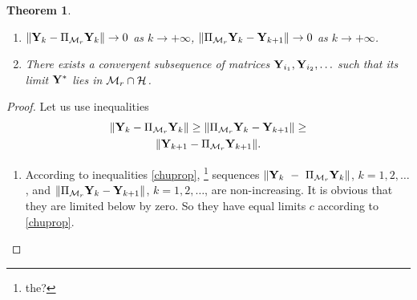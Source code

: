 \documentclass[sii]{ipart}
\newtheorem{theorem}{Theorem}
\begin{document}
\begin{theorem}
	\label{th:converg}
	\begin{enumerate}
		Let the space $\calM_r$ be closed in topology gererated by norm $\|\cdot\|$. Then
		\item $\|\mathbf{Y}_k - \Pi_{\mathcal{M}_r}\mathbf{Y}_k\| \to 0$ as $k \to +\infty$, $\|\Pi_{\mathcal{M}_r}\mathbf{Y}_k - \mathbf{Y}_{k+1}\| \to 0$ as $k \to +\infty$.
		\item There exists a convergent subsequence of matrices $\mathbf{Y}_{i_1}, \mathbf{Y}_{i_2}, \ldots$ such that its limit $\mathbf{Y}^*$ lies in $\mathcal{M}_r \cap \mathcal{H}$.
	\end{enumerate}
\end{theorem}
\begin{proof}
	Let us use inequalities \cite{Chu.etal2003}
	\begin{multline}
	\label{chuprop}
	\|\bfY_k - \Pi_{\calM_r} \bfY_k\| \ge \|\Pi_{\calM_r} \bfY_k - \bfY_{k + 1}\| \ge \\ \|\bfY_{k+1} - \Pi_{\calM_r} \bfY_{k + 1}\|.
	\end{multline}
	
	\begin{enumerate}
		\item According to inequalities \eqref{chuprop}, \footnote{the?} sequences $\|\mathbf{Y}_k~-~\Pi_{\mathcal{M}_r} \mathbf{Y}_k\|$, $k = 1, 2, \ldots$, and $\|\Pi_{\mathcal{M}_r} \mathbf{Y}_k - \mathbf{Y}_{k + 1}\|$, $k = 1, 2, \ldots$, are non-increasing. It is obvious that they are limited below by zero. So they have equal limits $c$ according to \eqref{chuprop}.
		

\end{enumerate}
\end{proof}
\end{document}
